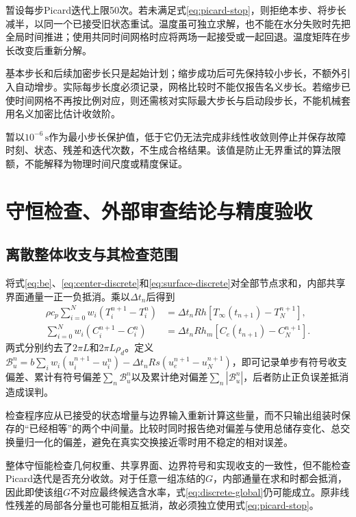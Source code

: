\documentclass[UTF8,a4paper,zihao=-4,fontset=none]{ctexart}
\numberwithin{equation}{section}
\newcommand{\units}[1]{\,\mathrm{#1}}
\begin{document}
暂设每步Picard迭代上限50次。若未满足式\eqref{eq:picard-stop}，则拒绝本步、将步长减半，以同一个已接受旧状态重试。温度虽可独立求解，也不能在水分失败时先把全局时间推进；使用共同时间网格时应将两场一起接受或一起回退。温度矩阵在步长改变后重新分解。

基本步长和后续加密步长只是起始计划；缩步成功后可先保持较小步长，不额外引入自动增步。实际每步长度必须记录，网格比较时不能仅报告名义步长。若缩步已使时间网格不再按比例对应，则还需核对实际最大步长与启动段步长，不能机械套用名义加密比估计收敛阶。

暂以$10^{-6}\units s$作为最小步长保护值，低于它仍无法完成非线性收敛则停止并保存故障时刻、状态、残差和迭代次数，不生成合格结果。该值是防止无界重试的算法限额，不能解释为物理时间尺度或精度保证。

\section{守恒检查、外部审查结论与精度验收}
\subsection{离散整体收支与其检查范围}
将式\eqref{eq:be}、\eqref{eq:center-discrete}和\eqref{eq:surface-discrete}对全部节点求和，内部共享界面通量一正一负抵消。乘以$\Delta t_n$后得到
\begin{equation}
\begin{aligned}
\rho c_p\sum_{i=0}^Nw_i(T_i^{n+1}-T_i^n)
&=\Delta t_nRh[T_\infty(t_{n+1})-T_N^{n+1}],\\
\sum_{i=0}^Nw_i(C_i^{n+1}-C_i^n)
&=\Delta t_nRh_m[C_e(t_{n+1})-C_N^{n+1}].
\end{aligned}
\label{eq:discrete-global}
\end{equation}
两式分别约去了$2\pi L$和$2\pi L\rho_d$。定义$\mathcal B_u^n=b\sum_iw_i(u_i^{n+1}-u_i^n)-\Delta t_nRs(u_e^{n+1}-u_N^{n+1})$，即可记录单步有符号收支偏差、累计有符号偏差$\sum_n\mathcal B_u^n$以及累计绝对偏差$\sum_n|\mathcal B_u^n|$，后者防止正负误差抵消造成误判。

检查程序应从已接受的状态增量与边界输入重新计算这些量，而不只输出组装时保存的“已经相等”的两个中间量。比较时同时报告绝对偏差与使用总储存变化、总交换量归一化的偏差，避免在真实交换接近零时用不稳定的相对误差。

整体守恒能检查几何权重、共享界面、边界符号和实现收支的一致性，但不能检查Picard迭代是否充分收敛。对于任意一组冻结的$G$，内部通量在求和时都会抵消，因此即使该组$G$不对应最终候选含水率，式\eqref{eq:discrete-global}仍可能成立。原非线性残差的局部各分量也可能相互抵消，故必须独立使用式\eqref{eq:picard-stop}。
\end{document}

